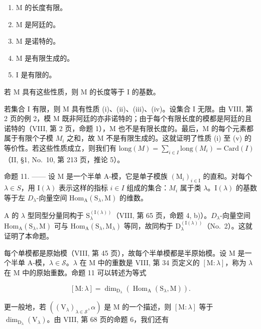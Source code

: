 \begin{enumerate}
\def\labelenumi{(\roman{enumi})}
\item
  M 的长度有限。
\item
  M 是阿廷的。
\item
  M 是诺特的。
\item
  M 是有限生成的。
\item
  I 是有限的。
\end{enumerate}

若 M 具有这些性质，则 M 的长度等于 I 的基数。

若集合 I 有限，则 M 具有性质 (i)、(ii)、(iii)、(iv)。设集合 I 无限。由 VIII, 第 2 页的例 2，模 M 既非阿廷的亦非诺特的；由于每个有限长度的模都是阿廷的且诺特的（VIII, 第 2 页，命题 1），M 也不是有限长度的。最后，M 的每个元素都属于有限个子模 \(M_{i}\) 之和，故 M 不是有限生成的。这就证明了性质 (i) 至 (v) 的等价性。若这些性质成立，则我们有 \(\text{long}(M) = \sum_{i \in I} \text{long}(M_{i}) = \text{Card}(I)\)（II, §1, No.~10, 第 213 页，推论 5）。

命题 11. —— 设 M 是一个半单 A-模，它是单子模族 \((\mathrm{M}_{i})_{i\in\mathrm{I}}\) 的直和。对每个 \(\lambda\in S\)，用 \(\mathrm{I}(\lambda)\) 表示这样的指标 \(i\in I\) 组成的集合：\(M_{i}\) 属于类 \(\lambda\)。\(\mathrm{I}(\lambda)\) 的基数等于左 \(D_{\lambda}\)-向量空间 \(\mathrm{Hom}_{\mathrm{A}}(\mathrm{S}_{\lambda},\mathrm{M})\) 的维数。

A 的 \(\lambda\) 型同型分量同构于 \(\mathrm{S}_{\lambda}^{(\mathrm{I}(\lambda))}\)（VIII, 第 65 页，命题 4, b)）。\(D_{\lambda}\)-向量空间 \(\mathrm{Hom}_{\mathrm{A}}(\mathrm{S}_{\lambda},\mathrm{M})\) 可与 \(\mathrm{Hom}_{\mathrm{A}}(\mathrm{S}_{\lambda},\mathrm{M}_{\lambda})\) 等同，故同构于 \(\mathrm{D}_{\lambda}^{(\mathrm{I}(\lambda))}\)（No.~2）。这就证明了本命题。

每个单模都是原始模（VIII, 第 45 页），故每个半单模都是半原始模。设 M 是一个半单 A-模，\(\lambda \in \mathcal{S}\)。\(\lambda\) 在 M 中的重数是 VIII, 第 34 页定义的 \([\mathrm{M}:\lambda]\)，称为 \(\lambda\) 在 M 中的原始重数。命题 11 可以转述为等式

\[
[ \mathrm{M}: \lambda ] = \dim_ {\mathrm{D} _ {\lambda}} (\operatorname{Hom} _ {\mathrm{A}} (\mathrm{S} _ {\lambda}, \mathrm{M})).\tag{11}
\]

更一般地，若 \(((\mathrm{V}_{\lambda})_{\lambda \in \mathcal{S}},\alpha)\) 是 M 的一个描述，则 \([\mathrm{M}:\lambda ]\) 等于 \(\dim_{\mathrm{D}_{\lambda}}(\mathrm{V}_{\lambda})\)。由 VIII, 第 68 页的命题 6，我们还有

